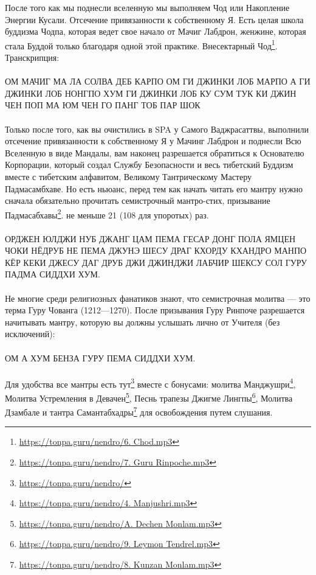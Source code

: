 После того как мы поднесли вселенную мы выполняем
Чод или Накопление Энергии Кусали. Отсечение
привязанности к собственному Я. Есть целая школа
буддизма Чодпа, которая ведет свое начало от Мачиг Лабдрон,
женжине, которая стала Буддой только благодаря одной
этой практике. Внесектарный
Чод\footnote{\url{https://tonpa.guru/nendro/6. Chod.mp3}}.
Транскрипция:
\\
\\
ОМ МАЧИГ МА ЛА СОЛВА ДЕБ КАРПО ОМ ГИ ДЖИНКИ ЛОБ
МАРПО А ГИ ДЖИНКИ ЛОБ НОНГПО ХУМ ГИ ДЖИНКИ ЛОБ
КУ СУМ ТУК КИ ДЖИН ЧЕН ПОП МА ЮМ ЧЕН ГО ПАНГ ТОБ ПАР ШОК
\\
\\
Только после того, как вы очистились в SPA у Самого Ваджрасаттвы,
выполнили отсечение привязанности к собственному Я у Мачинг Лабдрон
и поднесли Всю Вселенную в виде Мандалы, вам наконец разрешается
обратиться к Основателю Корпорации, который создал Службу
Безопасности и весь тибетский Буддизм вместе с тибетским
алфавитом, Великому Тантрическому Мастеру Падмасамбхаве.
Но есть ньюанс, перед тем как начать читать его мантру
нужно сначала обязательно прочитать семистрочный мантро-стих,
призывание Падмасабхавы\footnote{\url{https://tonpa.guru/nendro/7. Guru Rinpoche.mp3}}.
не меньше 21 (108 для упоротых) раз.
\\
\\
ОРДЖЕН ЮЛДЖИ НУБ ДЖАНГ ЦАМ ПЕМА ГЕСАР ДОНГ ПОЛА
ЯМЦЕН ЧОКИ НЁДРУБ НЕ ПЕМА ДЖУНЭ ШЕСУ ДРАГ КХОРДУ
КХАНДРО МАНПО КЁР КЕКИ ДЖЕСУ ДАГ ДРУБ ДЖИ ДЖИНДЖИ
ЛАБЧИР ШЕКСУ СОЛ ГУРУ ПАДМА СИДДХИ ХУМ.
\\
\\
Не многие среди религиозных фанатиков знают, что семистрочная
молитва — это терма Гуру Чованга (1212—1270). После призывания
Гуру Ринпоче разрешается начитывать мантру, которую вы должны
услышать лично от Учителя (без исключений):
\\
\\
ОМ А ХУМ БЕНЗА ГУРУ ПЕМА СИДДХИ ХУМ.
\\
\\
Для удобства все мантры есть тут\footnote{\url{https://tonpa.guru/nendro/}}
вместе с бонусами: молитва Манджушри\footnote{\url{https://tonpa.guru/nendro/4. Manjushri.mp3}},
Молитва Устремления в Девачен\footnote{\url{https://tonpa.guru/nendro/A. Dechen Monlam.mp3}},
Песнь трапезы Джигме Лингпы\footnote{\url{https://tonpa.guru/nendro/9. Leymon Tendrel.mp3}},
Молитва Дзамбале и тантра Самантабхадры\footnote{\url{https://tonpa.guru/nendro/8. Kunzan Monlam.mp3}} для
освобождения путем слушания.

